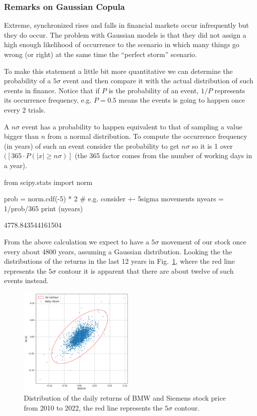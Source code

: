 \subsubsection{Remarks on Gaussian Copula}
Extreme, synchronized rises and falls in financial markets occur infrequently but they do occur. The problem with Gaussian models is that they did not assign a high enough likelihood of occurrence to the scenario in which many things go wrong (or right) at the same time the “perfect storm” scenario.

To make this statement a little bit more quantitative we can determine the probability of a $5\sigma$ event and then compare it with the actual distribution of such events in finance. Notice that if $P$ is the probability of an event, $1/P$ represents its occurrence frequency, e.g. $P=0.5$ means the events is going to happen once every 2 trials.

\begin{attention}
A $n\sigma$ event has a probability to happen equivalent to that of sampling a value bigger than $n$ from a normal distribution.
To compute the occurrence frequency (in years) of such an event consider the probability to get $n\sigma$ so it is 1 over $(
[365\cdot P(|x| \ge n\sigma)]$ (the 365 factor comes from the number of working days in a year).

\begin{attpython}
from scipy.stats import norm

prob = norm.cdf(-5) * 2 # e.g. consider +- 5sigma movements
nyears = 1/prob/365
print (nyears)
\end{attpython}
\begin{ioutput}
4778.843544161504
\end{ioutput}
\noindent
\end{attention}

From the above calculation we expect to have a $5\sigma$ movement of our stock once every about 4800 years, assuming a Gaussian distribution. Looking the the distributions of the returns in the last 12 years in Fig.~\ref{fig:5sigma_contour}, where the red line represents the $5\sigma$ contour it is apparent that there are about twelve of such events instead.

\begin{figure}[htbp]
\centering
\includegraphics[width=0.5\textwidth]{figures/5_sigma_contour}
\caption{Distribution of the daily returns of BMW and Siemens stock price from 2010 to 2022, the red line represents the $5\sigma$ contour.}
\label{fig:5sigma_contour}
\end{figure}

